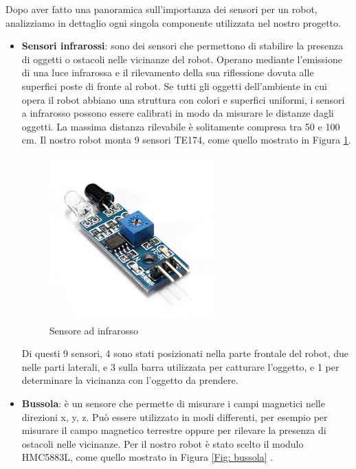 \documentclass[a4paper,12pt,italian]{article}
\begin{document}
Dopo aver fatto una panoramica sull’importanza dei sensori per un robot, analizziamo in dettaglio ogni singola componente utilizzata nel nostro progetto.
\begin{itemize}
	\item \textbf{Sensori infrarossi}: sono dei sensori che	permettono di stabilire la presenza di oggetti o ostacoli nelle vicinanze del robot. Operano mediante l’emissione di una luce infrarossa e il rilevamento della sua riflessione dovuta alle superfici poste di fronte al robot. Se tutti gli oggetti dell’ambiente in cui opera il robot abbiano una struttura con colori e superfici uniformi, i sensori a infrarosso possono essere calibrati in modo da misurare le distanze dagli oggetti. La massima distanza rilevabile è solitamente compresa tra 50 e 100 cm. Il nostro robot monta 9 sensori TE174, come quello mostrato in Figura \ref{Fig: ir}. 
		\begin{figure}[H]
			\begin{center}
			\includegraphics[scale=0.6]{ir}
			\caption{Sensore ad infrarosso}
			\label{Fig: ir}
			\end{center}
		\end{figure}
		Di questi 9 sensori, 4 sono stati posizionati nella parte frontale del robot, due nelle parti laterali, e 3 sulla barra utilizzata per catturare l'oggetto, e 1 per determinare la vicinanza con l'oggetto da prendere.
	\item \textbf{Bussola}: è un sensore che permette di misurare i campi magnetici nelle direzioni x, y, z. Può essere utilizzato in modi differenti, per esempio per misurare il campo magnetico terrestre oppure per rilevare la presenza di ostacoli nelle vicinanze. Per il nostro robot è stato scelto il modulo HMC5883L, come quello mostrato in Figura \ref{Fig: bussola} .
		\begin{figure}[H]
			\begin{center}

\end{center}
\end{figure}
\end{itemize}
\end{document}
